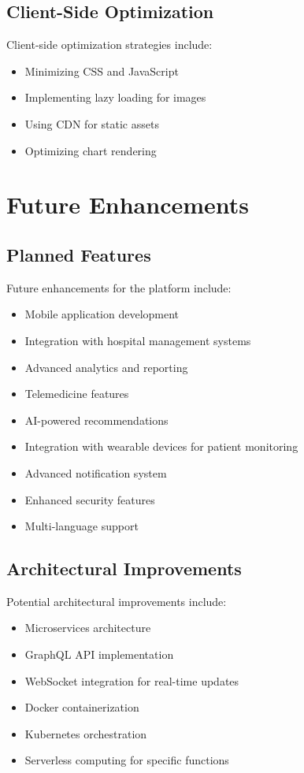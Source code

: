 \documentclass[12pt,a4paper]{report}
\begin{document}
\section{Client-Side Optimization}
Client-side optimization strategies include:

\begin{itemize}
    \item Minimizing CSS and JavaScript
    \item Implementing lazy loading for images
    \item Using CDN for static assets
    \item Optimizing chart rendering
\end{itemize}

\chapter{Future Enhancements}

\section{Planned Features}
Future enhancements for the platform include:

\begin{itemize}
    \item Mobile application development
    \item Integration with hospital management systems
    \item Advanced analytics and reporting
    \item Telemedicine features
    \item AI-powered recommendations
    \item Integration with wearable devices for patient monitoring
    \item Advanced notification system
    \item Enhanced security features
    \item Multi-language support
\end{itemize}

\section{Architectural Improvements}
Potential architectural improvements include:

\begin{itemize}
    \item Microservices architecture
    \item GraphQL API implementation
    \item WebSocket integration for real-time updates
    \item Docker containerization
    \item Kubernetes orchestration
    \item Serverless computing for specific functions
\end{itemize}
\end{document}
